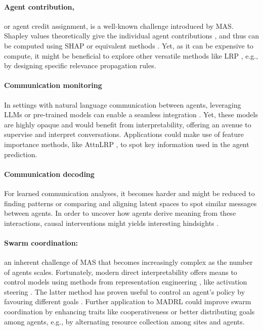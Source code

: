 \paragraph{Agent contribution,}or agent credit assignment, is a well-known challenge introduced by MAS. Shapley values theoretically give the individual agent contributions \cite{Shapley1988AVF}, and thus can be computed using SHAP or equivalent methods \cite{Lundberg2017AUA,Heuillet2021CollectiveEA,Wang2021SHAQIS}. Yet, as it can be expensive to compute, it might be beneficial to explore other versatile methods like LRP \cite{Bach2015OnPE}, e.g., by designing specific relevance propagation rules.

\paragraph{Communication monitoring} In settings with natural language communication between agents, leveraging LLMs or pre-trained models can enable a seamless integration \cite{Zhu2022ASO}. Yet, these models are highly opaque and would benefit from interpretability, offering an avenue to supervise and interpret conversations. Applications could make use of feature importance methods, like AttnLRP \cite{Achtibat2024AttnLRPAL}, to spot key information used in the agent prediction. 

\paragraph{Communication decoding}
For learned communication analyses, it becomes harder and might be reduced to finding patterns or comparing and aligning latent spaces to spot similar messages between agents.
In order to uncover how agents derive meaning from these interactions, causal interventions might 
yields interesting hindsights \cite{Kramar2024AtPAE}. 


\paragraph{Swarm coordination:} an inherent challenge of MAS that becomes increasingly complex as the number of agents scales. Fortunately, modern direct interpretability offers means to control models using methods from representation engineering \cite{zou2023representation}, like activation steering \cite{rimsky2023steering}. The latter method has proven useful to control an agent's policy by favouring different goals \cite{Mini2023UnderstandingAC}.
Further application to MADRL could improve swarm coordination by enhancing traits like cooperativeness or better distributing goals among agents, e.g., by alternating resource collection among sites and agents.



